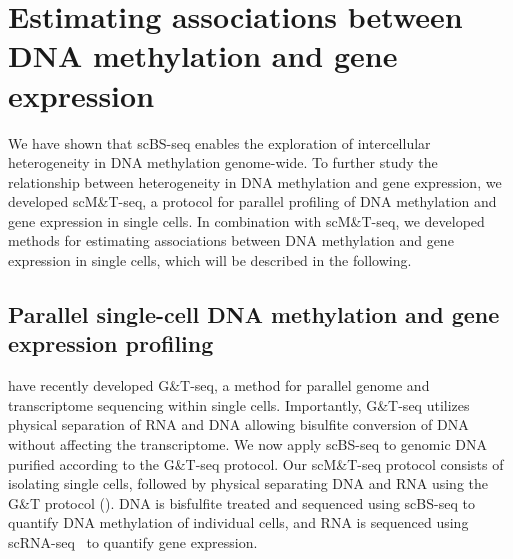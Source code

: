 \section{Estimating associations between DNA methylation and gene expression} \label{sec:mt}

\ifpdf
    \graphicspath{{Chapter3/mt/Figs/Raster/}{Chapter3/mt/Figs/PDF/}{Chapter3/mt/Figs/}}
\else
    \graphicspath{{Chapter3/mt/Figs/Vector/}{Chapter3/mt/Figs/}}
\fi

We have shown that scBS-seq enables the exploration of intercellular heterogeneity in DNA methylation genome-wide. To further study the relationship between heterogeneity in DNA methylation and gene expression, we developed scM\&T-seq, a protocol for parallel profiling of DNA methylation and gene expression in single cells. In combination with scM\&T-seq, we developed methods for estimating associations between DNA methylation and gene expression in single cells, which will be described in the following.

\subsection{Parallel single-cell DNA methylation and gene expression profiling}

\citet{macaulay_g&t-seq:_2015} have recently developed G\&T-seq, a method for parallel genome and transcriptome sequencing within single cells. Importantly, G\&T-seq utilizes physical separation of RNA and DNA allowing bisulfite conversion of DNA without affecting the transcriptome. We now apply scBS-seq to genomic DNA purified according to the G\&T-seq protocol. Our scM\&T-seq protocol consists of isolating single cells, followed by physical separating DNA and RNA using the G\&T protocol (). DNA is bisfulfite treated and sequenced using scBS-seq to quantify DNA methylation of individual cells, and RNA is sequenced using scRNA-seq~\citep{jaitin_massively_2014} to quantify gene expression.

